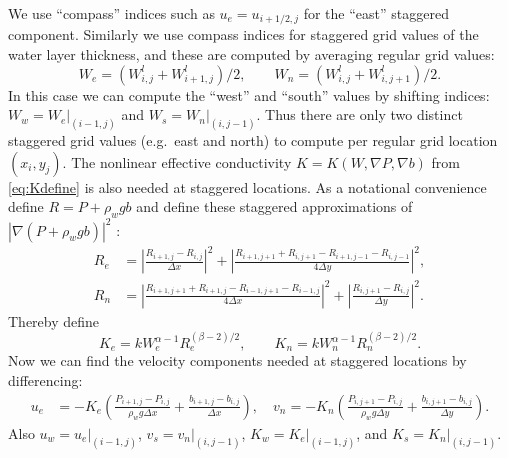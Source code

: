 \documentclass[11pt,final]{amsart}
\newcommand{\grad}{\nabla}
\begin{document}
We use ``compass'' indices such as $u_e = u_{i+1/2,j}$ for the ``east'' staggered component.  Similarly we use compass indices for staggered grid values of the water layer thickness, and these are computed by averaging regular grid values:
\begin{equation}
W_e = (W_{i,j}^l + W_{i+1,j}^l)/2, \qquad W_n = (W_{i,j}^l + W_{i,j+1}^l)/2. \label{eq:stagW}
\end{equation}
In this case we can compute the ``west'' and ``south'' values by shifting indices: $W_w = W_e\big|_{(i-1,j)}$ and $W_s = W_n\big|_{(i,j-1)}$.  Thus there are only two distinct staggered grid values (e.g.~east and north) to compute per regular grid location $(x_i,y_j)$.
The nonlinear effective conductivity $K=K(W,\grad P,\grad b)$ from \eqref{eq:Kdefine} is also needed at staggered locations.  As a notational convenience define $R=P+\rho_w g b$ and define these staggered approximations of $|\grad(P+\rho_w g b)|^2$ \citep[compare][]{Mahaffy}:
\begin{align*}
R_e &= \left|\frac{R_{i+1,j}-R_{i,j}}{\Delta x}\right|^2 + \left|\frac{R_{i+1,j+1}+R_{i,j+1} - R_{i+1,j-1}-R_{i,j-1}}{4\Delta y}\right|^2, \\
R_n &= \left|\frac{R_{i+1,j+1}+R_{i+1,j} - R_{i-1,j+1}-R_{i-1,j}}{4\Delta x}\right|^2 + \left|\frac{R_{i,j+1}-R_{i,j}}{\Delta y}\right|^2.
\end{align*}
Thereby define
\begin{equation}
K_e = k W_e^{\alpha-1} R_e^{(\beta-2)/2}, \qquad K_n = k W_n^{\alpha-1} R_n^{(\beta-2)/2}.  \label{eq:stagK}
\end{equation}
Now we can find the velocity components needed at staggered locations by differencing:
\begin{align}
u_e &= - K_e \left(\frac{P_{i+1,j}-P_{i,j}}{\rho_w g \Delta x} + \frac{b_{i+1,j}-b_{i,j}}{\Delta x}\right), \quad v_n = - K_n \left(\frac{P_{i,j+1}-P_{i,j}}{\rho_w g \Delta y} + \frac{b_{i,j+1}-b_{i,j}}{\Delta y}\right). \label{eq:velocitycomp}
\end{align}
Also $u_w = u_e\big|_{(i-1,j)}$, $v_s = v_n\big|_{(i,j-1)}$, $K_w = K_e\big|_{(i-1,j)}$, and $K_s = K_n\big|_{(i,j-1)}$.
\end{document}
